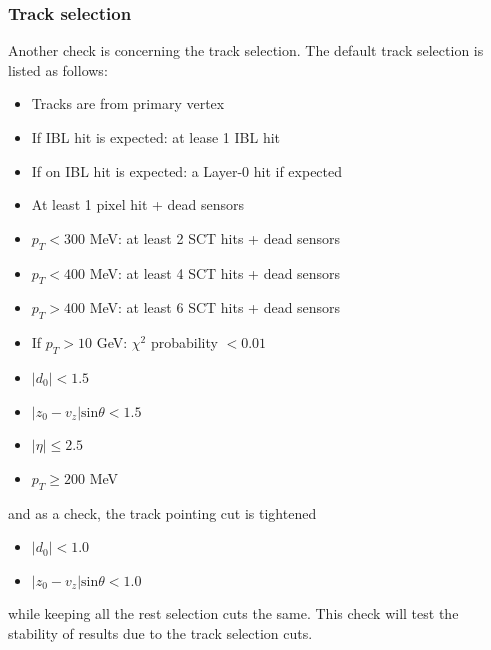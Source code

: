 \subsubsection{Track selection}
Another check is concerning the track selection. The default track selection is listed as follows:
\begin{itemize}
\item Tracks are from primary vertex
\item If IBL hit is expected: at lease 1 IBL hit
\item If on IBL hit is expected: a Layer-0 hit if expected
\item At least 1 pixel hit + dead sensors
\item $p_{T}<300$ MeV: at least 2 SCT hits + dead sensors
\item $p_{T}<400$ MeV: at least 4 SCT hits + dead sensors
\item $p_{T}>400$ MeV: at least 6 SCT hits + dead sensors
\item If $p_{T}>10$ GeV: $\chi^{2}$ probability $<0.01$
\item $|d_{0}|<1.5$
\item $|z_{0}-v_{z}|\text{sin}\theta<1.5$
\item $|\eta|\le 2.5$
\item $p_{T}\ge 200$ MeV
\end{itemize}
and as a check, the track pointing cut is tightened
\begin{itemize}
\item $|d_{0}|<1.0$
\item $|z_{0}-v_{z}|\text{sin}\theta<1.0$
\end{itemize}
while keeping all the rest selection cuts the same. This check will test the stability of results due to the track selection cuts.

